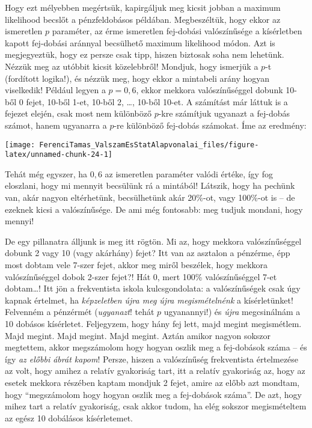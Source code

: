\documentclass[magyar,]{book}
\begin{document}
Hogy ezt mélyebben megértsük, kapirgáljuk meg kicsit jobban a maximum likelihood becslőt a pénzfeldobásos példában. Megbeszéltük, hogy ekkor az ismeretlen \(p\) paraméter, az érme ismeretlen fej-dobási valószínűsége a kísérletben kapott fej-dobási aránnyal becsülhető maximum likelihood módon. Azt is megjegyeztük, hogy ez persze csak tipp, hiszen biztosak soha nem lehetünk. Nézzük meg az utóbbit kicsit közelebbről! Mondjuk, hogy ismerjük a \(p\)-t (fordított logika!), és nézzük meg, hogy ekkor a mintabeli arány hogyan viselkedik! Például legyen a \(p=0,\!6\), ekkor mekkora valószínűséggel dobunk 10-ből 0 fejet, 10-ből 1-et, 10-ből 2, \ldots, 10-ből 10-et. A számítást már láttuk is a fejezet elején, csak most nem különböző \(p\)-kre számítjuk ugyanazt a fej-dobás számot, hanem ugyanarra a \(p\)-re különböző fej-dobás számokat. Íme az eredmény:

\begin{center}\texttt{[image: FerenciTamas\_ValszamEsStatAlapvonalai\_files/figure-latex/unnamed-chunk-24-1]} \end{center}

Tehát még egyszer, ha \(0,\!6\) az ismeretlen paraméter valódi értéke, így fog eloszlani, hogy mi mennyit becsülünk rá a mintából! Látszik, hogy ha pechünk van, akár nagyon eltérhetünk, becsülhetünk akár 20\%-ot, vagy 100\%-ot is -- de ezeknek kicsi a valószínűsége. De ami még fontosabb: meg tudjuk mondani, hogy mennyi!

De egy pillanatra álljunk is meg itt rögtön. Mi az, hogy mekkora valószínűséggel dobunk 2 vagy 10 (vagy akárhány) fejet? Itt van az asztalon a pénzérme, épp most dobtam vele 7-szer fejet, akkor meg miről beszélek, hogy mekkora valószínűséggel dobok 2-szer fejet?! Hát 0, mert 100\% valószínűséggel 7-et dobtam\ldots! Itt jön a frekventista iskola kulcsgondolata: a valószínűségek csak úgy kapnak értelmet, ha \emph{képzeletben újra meg újra megismételnénk} a kísérletünket! Felvenném a pénzérmét (\emph{ugyanazt}! tehát \(p\) ugyanannyi!) és \emph{újra} megcsinálnám a 10 dobásos kísérletet. Feljegyzem, hogy hány fej lett, majd megint megismétlem. Majd megint. Majd megint. Majd megint. Aztán amikor nagyon sokszor megtettem, akkor megszámolom hogy hogyan oszlik meg a fej-dobások száma -- és így \emph{az előbbi ábrát kapom}! Persze, hiszen a valószínűség frekventista értelmezése az volt, hogy amihez a relatív gyakoriság tart, itt a relatív gyakoriság az, hogy az esetek mekkora részében kaptam mondjuk 2 fejet, amire az előbb azt mondtam, hogy \enquote{megszámolom hogy hogyan oszlik meg a fej-dobások száma}. De azt, hogy mihez tart a relatív gyakoriság, csak akkor tudom, ha elég sokszor megismételtem az egész 10 dobálásos kísérletemet.
\end{document}

